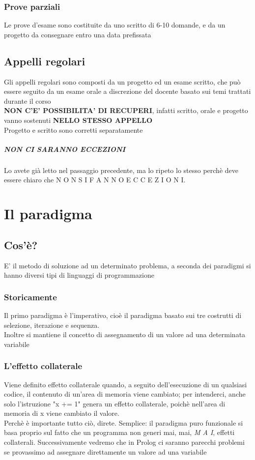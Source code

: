 \documentclass[12pt, a4paper, openany, oneside]{book}
\begin{document}
\subsection{Prove parziali}
\label{sub:prove_parziali}
Le prove d'esame sono costituite da uno scritto di 6-10 domande, e da un 
progetto da consegnare entro una data prefissata
\section{Appelli regolari}
\label{sec:appelli_regolari}
Gli appelli regolari sono composti da un progetto ed un esame scritto, che può
essere seguito da un esame orale a discrezione del docente basato sui temi 
trattati durante il corso
\\
\textbf{NON C'E' POSSIBILITA' DI RECUPERI}, infatti scritto, orale e progetto 
vanno sostenuti \color{red} \textbf{NELLO STESSO APPELLO} \color{black}
\\
Progetto e scritto sono corretti separatamente
\paragraph{NON CI SARANNO ECCEZIONI}
\label{par:non_ci_saranno_eccezioni}
Lo avete già letto nel passaggio precedente, ma lo ripeto lo stesso perchè 
deve essere chiaro che N O N  S I  F A N N O  E C C E Z I O N I.
\chapter{Il paradigma}
\section{Cos'è?}
E' il metodo di soluzione ad un determinato problema, a seconda dei paradigmi si
hanno diversi tipi di linguaggi di programmazione
\subsection{Storicamente}
Il primo paradigma è l'imperativo, cioè il paradigma basato sui tre costrutti
di selezione, iterazione e sequenza. \\
Inoltre si mantiene il concetto di assegnamento di un valore ad una determinata variabile
\subsection{L'effetto collaterale}
Viene definito effetto collaterale quando, a seguito dell'esecuzione di un qualsiasi
codice, il contenuto di un'area di memoria viene cambiato; per intenderci, anche
solo l'istruzione "x += 1" genera un effetto collaterale, poichè nell'area di 
memoria di x viene cambiato il valore. \\
Perchè è importante tutto ciò, direte. Semplice: il paradigma puro funzionale si 
basa proprio sul fatto che un programma non generi mai, mai, \emph{M A I}, effetti 
collaterali.
Successivamente vedremo che in Prolog ci saranno parecchi problemi se provassimo
ad assegnare direttamente un valore ad una variabile
\end{document}
